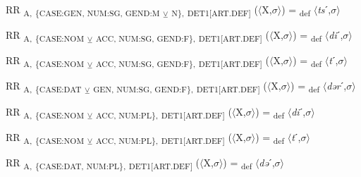 {\begin{exe}
 RR \textsubscript{A,} \textsubscript{\{CASE:GEN, NUM:SG, GEND:M} \textsubscript{${\veebar}$}\textsubscript{ N\},} \textsubscript{DET1[ART.DEF]} ($\langle$X,$\sigma $$\rangle$) = \textsubscript{def} $\langle$\textit{ts}ˊ,$\sigma $$\rangle$
\end{exe}

\begin{exe}
 RR \textsubscript{A,} \textsubscript{\{CASE:NOM} \textsubscript{${\veebar}$}\textsubscript{ ACC, NUM:SG, GEND:F\},} \textsubscript{DET1[ART.DEF]} ($\langle$X,$\sigma $$\rangle$) = \textsubscript{def} $\langle$\textit{di}ˊ,$\sigma $$\rangle$
\end{exe}

\begin{exe}
 RR \textsubscript{A,} \textsubscript{\{CASE:NOM} \textsubscript{${\veebar}$}\textsubscript{ ACC, NUM:SG, GEND:F\},} \textsubscript{DET1[ART.DEF]} ($\langle$X,$\sigma $$\rangle$) = \textsubscript{def} $\langle$\textit{t}ˊ,$\sigma $$\rangle$
\end{exe}

\begin{exe}
 RR \textsubscript{A,} \textsubscript{\{CASE:DAT} \textsubscript{${\veebar}$}\textsubscript{ GEN, NUM:SG, GEND:F\},} \textsubscript{DET1[ART.DEF]} ($\langle$X,$\sigma $$\rangle$) = \textsubscript{def} $\langle$\textit{dər}ˊ,$\sigma $$\rangle$
\end{exe}

\begin{exe}
 RR \textsubscript{A,} \textsubscript{\{CASE:NOM} \textsubscript{${\veebar}$}\textsubscript{ ACC, NUM:PL\},} \textsubscript{DET1[ART.DEF]} ($\langle$X,$\sigma $$\rangle$) = \textsubscript{def} $\langle$\textit{di}ˊ,$\sigma $$\rangle$
\end{exe}

\begin{exe}
 RR \textsubscript{A,} \textsubscript{\{CASE:NOM} \textsubscript{${\veebar}$}\textsubscript{ ACC, NUM:PL\},} \textsubscript{DET1[ART.DEF]} ($\langle$X,$\sigma $$\rangle$) = \textsubscript{def} $\langle$\textit{t}ˊ,$\sigma $$\rangle$
\end{exe}

\begin{exe}
 RR \textsubscript{A,} \textsubscript{\{CASE:DAT, NUM:PL\},} \textsubscript{DET1[ART.DEF]} ($\langle$X,$\sigma $$\rangle$) = \textsubscript{def} $\langle$\textit{də}ˊ,$\sigma $$\rangle$
\end{exe}

}
